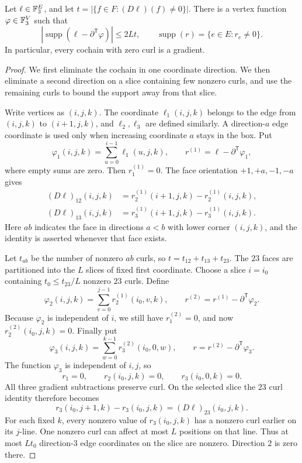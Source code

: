 \begin{lemma}\label{sup:sparse-cochain}
Let $\ell\in\mathbb F_3^E$, and let
$t=|\{f\in F:(D\ell)(f)\ne0\}|$. There is a vertex function
$\varphi\in\mathbb F_3^V$ such that
\[
 |\operatorname{supp}(\ell-\partial^{\mathsf T}\varphi)|\le2Lt,
 \qquad
 \operatorname{supp}(r)=\{e\in E:r_e\ne0\}.
\]
In particular, every cochain with zero curl is a gradient.
\end{lemma}

\begin{proof}
We first eliminate the cochain in one coordinate direction. We then
eliminate a second direction on a slice containing few nonzero curls,
and use the remaining curls to bound the support away from that slice.

Write vertices as $(i,j,k)$. The coordinate $\ell_1(i,j,k)$ belongs to
the edge from $(i,j,k)$ to $(i+1,j,k)$, and $\ell_2,\ell_3$ are defined
similarly. A direction-$a$ edge coordinate is used only when increasing
coordinate $a$ stays in the box. Put
\[
 \varphi_1(i,j,k)=\sum_{u=0}^{i-1}\ell_1(u,j,k),
 \qquad r^{(1)}=\ell-\partial^{\mathsf T}\varphi_1,
\]
where empty sums are zero. Then $r^{(1)}_1=0$. The face orientation
$+1,+a,-1,-a$ gives
\begin{align}
 (D\ell)_{12}(i,j,k)
   &=r^{(1)}_2(i+1,j,k)-r^{(1)}_2(i,j,k),\label{sup:curl12}\\
 (D\ell)_{13}(i,j,k)
   &=r^{(1)}_3(i+1,j,k)-r^{(1)}_3(i,j,k).\label{sup:curl13}
\end{align}
Here $ab$ indicates the face in directions $a<b$ with lower corner
$(i,j,k)$, and the identity is asserted whenever that face exists.

Let $t_{ab}$ be the number of nonzero $ab$ curls, so
$t=t_{12}+t_{13}+t_{23}$. The $23$ faces are partitioned into the $L$
slices of fixed first coordinate. Choose a slice $i=i_0$ containing
$t_0\le t_{23}/L$ nonzero $23$ curls. Define
\[
 \varphi_2(i,j,k)=\sum_{v=0}^{j-1}r^{(1)}_2(i_0,v,k),
 \qquad r^{(2)}=r^{(1)}-\partial^{\mathsf T}\varphi_2.
\]
Because $\varphi_2$ is independent of $i$, we still have
$r^{(2)}_1=0$, and now $r^{(2)}_2(i_0,j,k)=0$. Finally put
\[
 \varphi_3(i,j,k)=\sum_{w=0}^{k-1}r^{(2)}_3(i_0,0,w),
 \qquad r=r^{(2)}-\partial^{\mathsf T}\varphi_3.
\]
The function $\varphi_3$ is independent of $i,j$, so
\[
 r_1=0,\qquad r_2(i_0,j,k)=0,\qquad r_3(i_0,0,k)=0.
\]
All three gradient subtractions preserve curl. On the selected slice
the $23$ curl identity therefore becomes
\[
 r_3(i_0,j+1,k)-r_3(i_0,j,k)=(D\ell)_{23}(i_0,j,k).
\]
For each fixed $k$, every nonzero value of $r_3(i_0,j,k)$ has a nonzero
curl earlier on its $j$-line. One nonzero curl can affect at most $L$
positions on that line. Thus at most $Lt_0$ direction-$3$ edge
coordinates on the slice are nonzero. Direction $2$ is zero there.


\end{proof}
